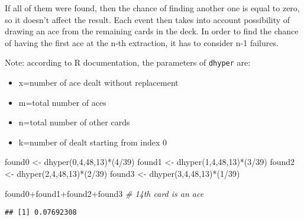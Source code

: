 \documentclass[
]{article}
\newenvironment{Shaded}{\begin{snugshade}}{\end{snugshade}}
\newcommand{\CommentTok}[1]{\textcolor[rgb]{0.56,0.35,0.01}{\textit{#1}}}
\newcommand{\DecValTok}[1]{\textcolor[rgb]{0.00,0.00,0.81}{#1}}
\newcommand{\FunctionTok}[1]{\textcolor[rgb]{0.00,0.00,0.00}{#1}}
\newcommand{\NormalTok}[1]{#1}
\newcommand{\OtherTok}[1]{\textcolor[rgb]{0.56,0.35,0.01}{#1}}
\newcommand{\SpecialCharTok}[1]{\textcolor[rgb]{0.00,0.00,0.00}{#1}}
\providecommand{\tightlist}{%
  \setlength{\itemsep}{0pt}\setlength{\parskip}{0pt}}
\begin{document}
If all of them were found, then the chance of finding another one is
equal to zero, so it doesn't affect the result. Each event then takes
into account possibility of drawing an ace from the remaining cards in
the deck. In order to find the chance of having the first ace at the
n-th extraction, it has to consider n-1 failures.

Note: according to R documentation, the parameters of \texttt{dhyper}
are:

\begin{itemize}
\tightlist
\item
  x=number of ace dealt without replacement
\item
  m=total number of aces
\item
  n=total number of other cards
\item
  k=number of dealt starting from index 0
\end{itemize}

\begin{Shaded}
\begin{Highlighting}[]
\NormalTok{found0 }\OtherTok{\textless{}{-}} \FunctionTok{dhyper}\NormalTok{(}\DecValTok{0}\NormalTok{,}\DecValTok{4}\NormalTok{,}\DecValTok{48}\NormalTok{,}\DecValTok{13}\NormalTok{)}\SpecialCharTok{*}\NormalTok{(}\DecValTok{4}\SpecialCharTok{/}\DecValTok{39}\NormalTok{)}
\NormalTok{found1 }\OtherTok{\textless{}{-}} \FunctionTok{dhyper}\NormalTok{(}\DecValTok{1}\NormalTok{,}\DecValTok{4}\NormalTok{,}\DecValTok{48}\NormalTok{,}\DecValTok{13}\NormalTok{)}\SpecialCharTok{*}\NormalTok{(}\DecValTok{3}\SpecialCharTok{/}\DecValTok{39}\NormalTok{) }
\NormalTok{found2 }\OtherTok{\textless{}{-}} \FunctionTok{dhyper}\NormalTok{(}\DecValTok{2}\NormalTok{,}\DecValTok{4}\NormalTok{,}\DecValTok{48}\NormalTok{,}\DecValTok{13}\NormalTok{)}\SpecialCharTok{*}\NormalTok{(}\DecValTok{2}\SpecialCharTok{/}\DecValTok{39}\NormalTok{) }
\NormalTok{found3 }\OtherTok{\textless{}{-}} \FunctionTok{dhyper}\NormalTok{(}\DecValTok{3}\NormalTok{,}\DecValTok{4}\NormalTok{,}\DecValTok{48}\NormalTok{,}\DecValTok{13}\NormalTok{)}\SpecialCharTok{*}\NormalTok{(}\DecValTok{1}\SpecialCharTok{/}\DecValTok{39}\NormalTok{)}

\NormalTok{found0}\SpecialCharTok{+}\NormalTok{found1}\SpecialCharTok{+}\NormalTok{found2}\SpecialCharTok{+}\NormalTok{found3 }\CommentTok{\# 14th card is an ace}
\end{Highlighting}
\end{Shaded}

\begin{verbatim}
## [1] 0.07692308
\end{verbatim}
\end{document}
